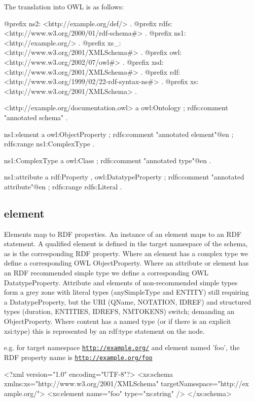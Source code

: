 The translation into OWL is as follows:


\begin{DoxyCodeInclude}
@prefix ns2:     <http://example.org/def/> .
@prefix rdfs:    <http://www.w3.org/2000/01/rdf-schema#> .
@prefix ns1:     <http://example.org/> .
@prefix xs_:     <http://www.w3.org/2001/XMLSchema#> .
@prefix owl:     <http://www.w3.org/2002/07/owl#> .
@prefix xsd:     <http://www.w3.org/2001/XMLSchema#> .
@prefix rdf:     <http://www.w3.org/1999/02/22-rdf-syntax-ns#> .
@prefix xs:      <http://www.w3.org/2001/XMLSchema> .

<http://example.org/documentation.owl>
      a       owl:Ontology ;
      rdfs:comment "annotated schema" .

ns1:element
      a       owl:ObjectProperty ;
      rdfs:comment "annotated element"@en ;
      rdfs:range ns1:ComplexType .

ns1:ComplexType
      a       owl:Class ;
      rdfs:comment "annotated type"@en .

ns1:attribute
      a       rdf:Property , owl:DatatypeProperty ;
      rdfs:comment "annotated attribute"@en ;
      rdfs:range rdfs:Literal .
\end{DoxyCodeInclude}
 \hypertarget{element}{}\subsection{element}\label{element}
Elements map to RDF properties. An instance of an element maps to an RDF statement. A qualified element is defined in the target namespace of the schema, as is the corresponding RDF property. Where an element has a complex type we define a corresponding OWL ObjectProperty. Where an attribute or element has an RDF recommended simple type we define a corresponding OWL DatatypeProperty. Attribute and elements of non-\/recommended simple types form a grey zone with literal types (anySimpleType and ENTITY) still requiring a DatatypeProperty, but the URI (QName, NOTATION, IDREF) and structured types (duration, ENTITIES, IDREFS, NMTOKENS) switch; demanding an ObjectProperty. Where content has a named type (or if there is an explicit xsi:type) this is represented by an rdf:type statement on the node.

e.g. for target namespace \href{http://example.org/}{\tt http://example.org/} and element named 'foo', the RDF property name is \href{http://example.org/foo}{\tt http://example.org/foo}


\begin{DoxyCodeInclude}
<?xml version="1.0" encoding="UTF-8"?>
<xs:schema xmlns:xs="http://www.w3.org/2001/XMLSchema" targetNamespace="http://ex
      ample.org/">
        <xs:element name="foo" type="xs:string" />
</xs:schema>
\end{DoxyCodeInclude}


